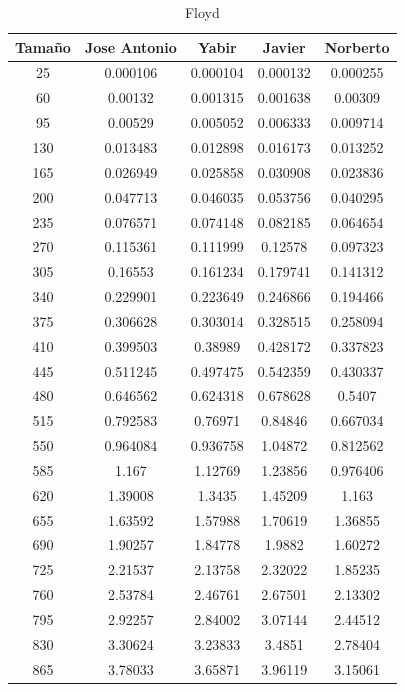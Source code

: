 \documentclass[11pt,a4paper]{article}
\begin{document}
\begin{table}[h]
	\centering
	\caption{Floyd}
	\begin{tabular}{ | c | c  | c | c | c | }
		\hline
		Tama\~no & Jose Antonio & Yabir & Javier & Norberto\\
		\hline
		25	&	0.000106	&	0.000104	&	0.000132	&	0.000255	\\
		60	&	0.00132	&	0.001315	&	0.001638	&	0.00309	\\
		95	&	0.00529	&	0.005052	&	0.006333	&	0.009714	\\
		130	&	0.013483	&	0.012898	&	0.016173	&	0.013252	\\
		165	&	0.026949	&	0.025858	&	0.030908	&	0.023836	\\
		200	&	0.047713	&	0.046035	&	0.053756	&	0.040295	\\
		235	&	0.076571	&	0.074148	&	0.082185	&	0.064654	\\
		270	&	0.115361	&	0.111999	&	0.12578	&	0.097323	\\
		305	&	0.16553	&	0.161234	&	0.179741	&	0.141312	\\
		340	&	0.229901	&	0.223649	&	0.246866	&	0.194466	\\
		375	&	0.306628	&	0.303014	&	0.328515	&	0.258094	\\
		410	&	0.399503	&	0.38989	&	0.428172	&	0.337823	\\
		445	&	0.511245	&	0.497475	&	0.542359	&	0.430337	\\
		480	&	0.646562	&	0.624318	&	0.678628	&	0.5407	\\
		515	&	0.792583	&	0.76971	&	0.84846	&	0.667034	\\
		550	&	0.964084	&	0.936758	&	1.04872	&	0.812562	\\
		585	&	1.167	&	1.12769	&	1.23856	&	0.976406	\\
		620	&	1.39008	&	1.3435	&	1.45209	&	1.163	\\
		655	&	1.63592	&	1.57988	&	1.70619	&	1.36855	\\
		690	&	1.90257	&	1.84778	&	1.9882	&	1.60272	\\
		725	&	2.21537	&	2.13758	&	2.32022	&	1.85235	\\
		760	&	2.53784	&	2.46761	&	2.67501	&	2.13302	\\
		795	&	2.92257	&	2.84002	&	3.07144	&	2.44512	\\
		830	&	3.30624	&	3.23833	&	3.4851	&	2.78404	\\
		865	&	3.78033	&	3.65871	&	3.96119	&	3.15061	\\
		\hline
	\end{tabular}
\end{table}
\end{document}
